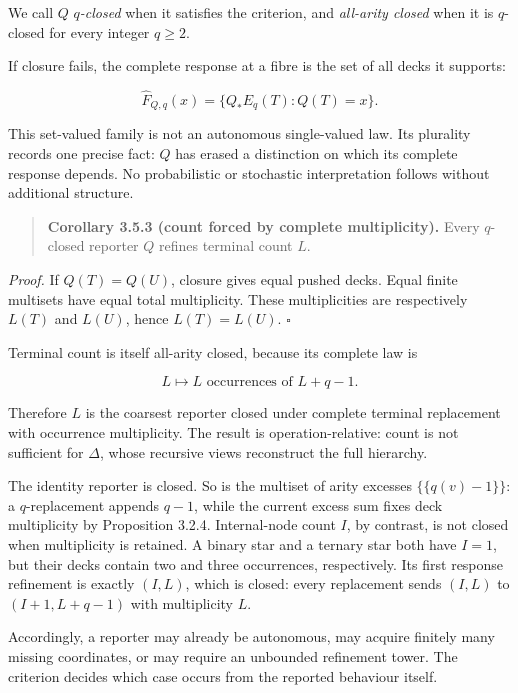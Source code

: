 \documentclass[11pt,a4paper]{article}
\begin{document}
We call \(Q\) \(q\)\emph{-closed} when it satisfies the criterion, and
\emph{all-arity closed} when it is \(q\)-closed for every integer
\(q \geq 2\).

If closure fails, the complete response at a fibre is the set of all
decks it supports:

\[{\widehat{F}}_{Q,q}(x) = \{ Q_{*}E_{q}(T):Q(T) = x\}.\]

This set-valued family is not an autonomous single-valued law. Its
plurality records one precise fact: \(Q\) has erased a distinction on
which its complete response depends. No probabilistic or stochastic
interpretation follows without additional structure.

\begin{quote}
\textbf{Corollary 3.5.3 (count forced by complete multiplicity).} Every
\(q\)-closed reporter \(Q\) refines terminal count \(L\).
\end{quote}

\emph{Proof.} If \(Q(T) = Q(U)\), closure gives equal pushed decks.
Equal finite multisets have equal total multiplicity. These
multiplicities are respectively \(L(T)\) and \(L(U)\), hence
\(L(T) = L(U)\). \(\ensuremath{\square}\)

Terminal count is itself all-arity closed, because its complete law is

\[L \mapsto L\text{ occurrences of }L + q - 1.\]

Therefore \(L\) is the coarsest reporter closed under complete terminal
replacement with occurrence multiplicity. The result is
operation-relative: count is not sufficient for \(\Delta\), whose
recursive views reconstruct the full hierarchy.

The identity reporter is closed. So is the multiset of arity excesses
\(\{\{ q(v) - 1\}\}\): a \(q\)-replacement appends \(q - 1\), while the
current excess sum fixes deck multiplicity by Proposition 3.2.4.
Internal-node count \(I\), by contrast, is not closed when multiplicity
is retained. A binary star and a ternary star both have \(I = 1\), but
their decks contain two and three occurrences, respectively. Its first
response refinement is exactly \((I,L)\), which is closed: every
replacement sends \((I,L)\) to \((I + 1,L + q - 1)\) with multiplicity
\(L\).

Accordingly, a reporter may already be autonomous, may acquire finitely
many missing coordinates, or may require an unbounded refinement tower.
The criterion decides which case occurs from the reported behaviour
itself.
\end{document}
